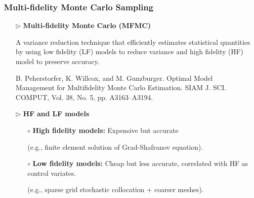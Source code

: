 \documentclass{beamer}
\begin{document}
\begin{frame}[t]
    \frametitle{Multi-fidelity Monte Carlo Sampling}
\begin{itemize}[leftmargin=5pt] 
\item[$\triangleright$] \textcolor{myblue3}{\bf Multi-fidelity Monte Carlo (MFMC)} 

{\small A variance reduction technique that efficiently estimates statistical quantities by using low fidelity (LF) models to reduce variance and high fidelity (HF) model to preserve accuracy.}

%
\vspace{3mm}
%
{\fontsize{7}{7}\selectfont \textcolor{mygray2}{B. Peherstorfer, K. Willcox, and M. Gunzburger. Optimal Model Management for Multifidelity Monte Carlo Estimation. SIAM J. SCI. COMPUT, Vol. 38, No. 5, pp. A3163–A3194.}\par}
%

\item[$\triangleright$] \textcolor{myblue3}{\bf HF and LF models} 

{\small
\begin{itemize}[leftmargin=15pt] 
     \item[$\circ$] {\bf High fidelity models:} Expensive but accurate 
     
     (e.g., finite element solution of Grad-Shafranov equation).
     \item[$\circ$] {\bf Low fidelity models:} Cheap but less accurate, correlated with HF as control variates.
     
     (e.g., sparse grid stochastic collocation $+$ coarser meshes).


\end{itemize}
 }

\end{itemize}
\end{frame}
\end{document}
